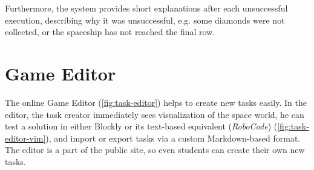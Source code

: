 
Furthermore, the system provides short explanations after each unsuccessful execution,
describing why it was unsuccessful,
e.g. some diamonds were not collected,
or the spaceship has not reached the final row.


\section{Game Editor}  %
\label{sec:robomission.task-editor}

The online Game Editor (\cref{fig:task-editor})
helps to create new tasks easily.
In the editor, the task creator immediately sees visualization of the space world,
he can test a solution in either Blockly or its text-based equivalent (\emph{RoboCode})
(\cref{fig:task-editor-vim}),
and import or export tasks via a custom Markdown-based format.
The editor is a part of the public site, so even students can create their own new tasks.

